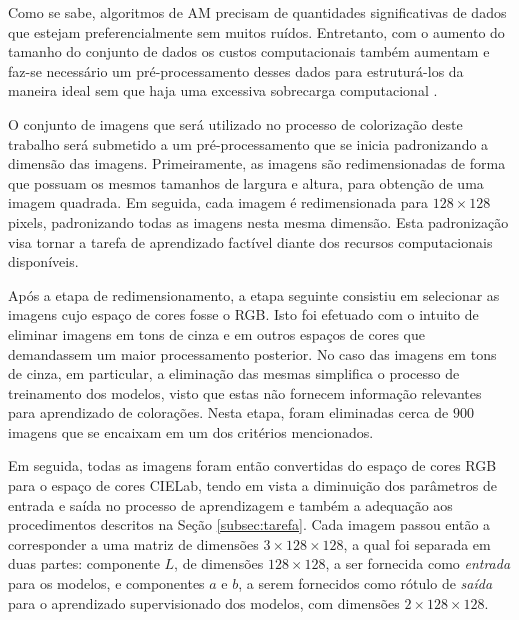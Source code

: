 Como se sabe, algoritmos de AM precisam de quantidades significativas de dados que estejam preferencialmente sem muitos ruídos. Entretanto, com o aumento do tamanho do conjunto de dados os custos computacionais também aumentam e faz-se necessário um pré-processamento desses dados para estruturá-los da maneira ideal sem que haja uma excessiva sobrecarga computacional \cite{ref:marsland}.

O conjunto de imagens que será utilizado no processo de colorização deste trabalho será submetido a um pré-processamento que se inicia padronizando a dimensão das imagens. Primeiramente, as imagens são redimensionadas de forma que possuam os mesmos tamanhos de largura e altura, para obtenção de uma imagem quadrada. Em seguida, cada imagem é redimensionada para $128 \times 128$ pixels, padronizando todas as imagens nesta mesma dimensão. Esta padronização visa tornar a tarefa de aprendizado factível diante dos recursos computacionais disponíveis.

Após a etapa de redimensionamento, a etapa seguinte consistiu em selecionar as imagens cujo espaço de cores fosse o RGB. Isto foi efetuado com o intuito de eliminar imagens em tons de cinza e em outros espaços de cores que demandassem um maior processamento posterior. No caso das imagens em tons de cinza, em particular, a eliminação das mesmas simplifica o processo de treinamento dos modelos, visto que estas não fornecem informação relevantes para aprendizado de colorações. Nesta etapa, foram eliminadas cerca de $900$ imagens que se encaixam em um dos critérios mencionados.

Em seguida, todas as imagens foram então convertidas do espaço de cores RGB para o espaço de cores CIELab, tendo em vista a diminuição dos parâmetros de entrada e saída no processo de aprendizagem e também a adequação aos procedimentos descritos na Seção \ref{subsec:tarefa}. Cada imagem passou então a corresponder a uma matriz de dimensões $3\times 128 \times 128$, a qual foi separada em duas partes: componente $L$, de dimensões $128 \times 128$, a ser fornecida como \emph{entrada} para os modelos, e componentes $a$ e $b$, a serem fornecidos como rótulo de \emph{saída} para o aprendizado supervisionado dos modelos, com dimensões $2 \times 128 \times 128$.
